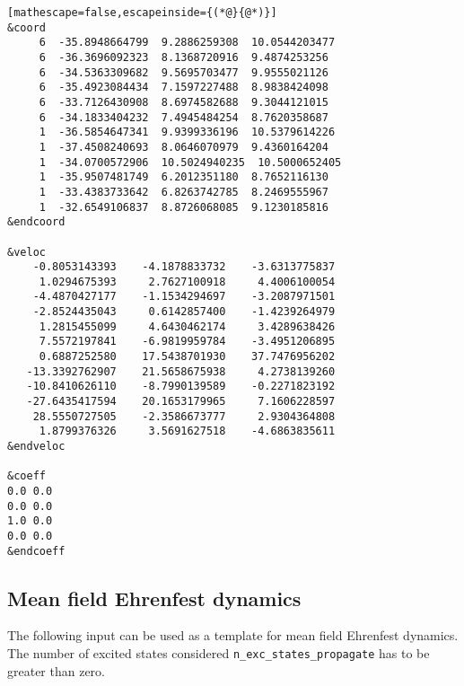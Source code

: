 \begin{lstlisting}[mathescape=false,escapeinside={(*@}{@*)}]
&coord
     6  -35.8948664799  9.2886259308  10.0544203477
     6  -36.3696092323  8.1368720916  9.4874253256
     6  -34.5363309682  9.5695703477  9.9555021126
     6  -35.4923084434  7.1597227488  8.9838424098
     6  -33.7126430908  8.6974582688  9.3044121015
     6  -34.1833404232  7.4945484254  8.7620358687
     1  -36.5854647341  9.9399336196  10.5379614226
     1  -37.4508240693  8.0646070979  9.4360164204
     1  -34.0700572906  10.5024940235  10.5000652405
     1  -35.9507481749  6.2012351180  8.7652116130
     1  -33.4383733642  6.8263742785  8.2469555967
     1  -32.6549106837  8.8726068085  9.1230185816
&endcoord

&veloc
    -0.8053143393    -4.1878833732    -3.6313775837
     1.0294675393     2.7627100918     4.4006100054
    -4.4870427177    -1.1534294697    -3.2087971501
    -2.8524435043     0.6142857400    -1.4239264979
     1.2815455099     4.6430462174     3.4289638426
     7.5572197841    -6.9819959784    -3.4951206895
     0.6887252580    17.5438701930    37.7476956202
   -13.3392762907    21.5658675938     4.2738139260
   -10.8410626110    -8.7990139589    -0.2271823192
   -27.6435417594    20.1653179965     7.1606228597
    28.5550727505    -2.3586673777     2.9304364808
     1.8799376326     3.5691627518    -4.6863835611
&endveloc

&coeff
0.0 0.0
0.0 0.0
1.0 0.0
0.0 0.0
&endcoeff
\end{lstlisting}

\subsection{Mean field Ehrenfest dynamics}

The following input can be used as a template for mean field Ehrenfest dynamics. The number of excited states considered \verb+n_exc_states_propagate+ has to be greater than zero.

